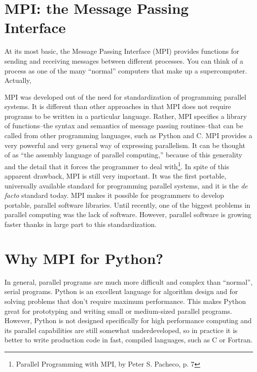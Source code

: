 \section*{MPI: the Message Passing Interface}
At its most basic, the Message Passing Interface (MPI) provides functions for sending
and receiving messages between different processes. You can think of a process as one of the many ``normal'' computers that make up a supercomputer. Actually,

MPI was developed out of the need for standardization of programming parallel systems.
It is different than other approaches in that MPI does not require programs to be written in a particular language.
Rather, MPI specifies a library of functions--the syntax and semantics of message passing routines--that can be called from other programming languages,
such as Python and C. MPI provides a very powerful and very general way of expressing parallelism.
It can be thought of as ``the assembly language of parallel computing,'' because of this
generality and the detail that it forces the programmer to deal with\footnote{Parallel Programming with MPI, by Peter S. Pacheco, p. 7}.
In spite of this apparent drawback, MPI is still very important. It was the first portable,
universally available standard for programming parallel systems, and it is the \emph{de facto} standard today.
MPI makes it possible for programmers to develop portable, parallel software libraries.
Until recently, one of the biggest problems in parallel computing was the lack of software.
However, parallel software is growing faster thanks in large part to this standardization.


\section*{Why MPI for Python?}
In general, parallel programs are much more difficult and complex than ``normal'', serial programs.
Python is an excellent language for algorithm design and for solving problems that
don't require maximum performance.
This makes Python great for prototyping and writing small or medium-sized parallel programs.
However, Python is not designed specifically for high performance computing and its
parallel capabilities are still somewhat underdeveloped, so in practice it is better
to write production code in fast, compiled languages, such as C or Fortran.


